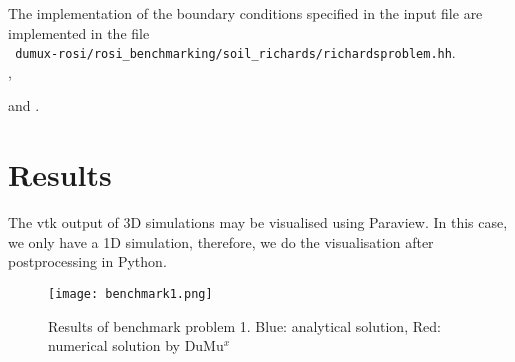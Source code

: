 %	

%	

The implementation of the boundary conditions specified in the input file are implemented in the file\\ 
\verb+ dumux-rosi/rosi_benchmarking/soil_richards/richardsproblem.hh+.\\
,
%
	
and
.		
											

\section*{Results}
The vtk output of 3D simulations may be visualised using Paraview. In this case, we only have a 1D simulation, therefore, we do the visualisation after postprocessing in Python. 

\begin{figure}[ht]
	\centering
  \texttt{[image: benchmark1.png]}
	\captionsetup{labelformat=empty}
	\caption{Results of benchmark problem 1. Blue: analytical solution, Red: numerical solution by DuMu$^x$}
\end{figure}

